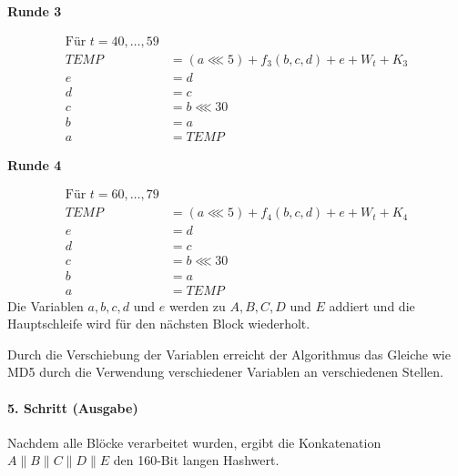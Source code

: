 \documentclass[12pt,a4paper]{scrartcl}
\numberwithin{equation}{section}
\numberwithin{myalgctr}{section}
\numberwithin{mytheoremctr}{section}
\newcommand{\mpar}[1]{\paragraph*{#1}\mbox{}\par}
\begin{document}
	
	\noindent \textbf{Runde 3}\par
	\begin{align*}
	\text{Für $t = 40,\dots ,59$}\\
	TEMP &= (a\lll 5) + f_3(b,c,d) + e + W_t + K_3\\
	e&=d\\
	d&=c\\
	c&=b\lll 30\\
	b&=a\\
	a&=TEMP
	\end{align*}

	\noindent \textbf{Runde 4}\par
	\begin{align*}
	\text{Für $t = 60,\dots ,79$}\\
	TEMP &= (a\lll 5) + f_4(b,c,d) + e + W_t + K_4\\
	e&=d\\
	d&=c\\
	c&=b\lll 30\\
	b&=a\\
	a&=TEMP
	\end{align*}
\newline
	Die Variablen $a,b,c,d$ und $e$ werden zu $A,B,C,D$ und $E$ addiert und die Hauptschleife wird für den nächsten Block wiederholt.\autocite[vgl.][S. 505 f.]{angewandteKryptographie}\\\par\noindent
	Durch die Verschiebung der Variablen erreicht der Algorithmus das Gleiche wie MD5 durch die Verwendung verschiedener Variablen an verschiedenen Stellen.\autocite[506]{angewandteKryptographie}
	
	\mpar{5. Schritt (Ausgabe)}\noindent
	Nachdem alle Blöcke verarbeitet wurden, ergibt die Konkatenation $A\parallel B\parallel C\parallel D\parallel E$ den 160-Bit langen Hashwert.
	\newpage
\end{document}

